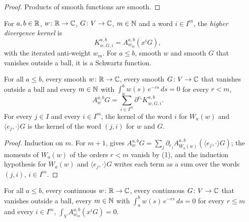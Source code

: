 \begin{proof}
\leanok
Products of smooth functions are smooth.
\end{proof}

\begin{definition}
\label{def:higher-divergence-kernel}
\leanok
{}
For $a, b \in \mathbb{R}$, $w \colon \mathbb{R} \to \mathbb{C}$, $G \colon V \to \mathbb{C}$, $m \in \mathbb{N}$ and a word $i \in I^m$,
the \emph{higher divergence kernel} is
\[
  K^{a,b}_{w,G,i} = A^{a,b}_{w_m} (x^i G) ,
\]
with the iterated anti-weight $w_m$. For $a \leq b$, smooth $w$ and smooth $G$ that vanishes
outside a ball, it is a Schwartz function.
\end{definition}

\begin{theorem}
\label{thm:weighted-dilation-higher}
\leanok
{}
For all $a \leq b$, every smooth $w \colon \mathbb{R} \to \mathbb{C}$, every smooth $G \colon V \to \mathbb{C}$ that
vanishes outside a ball and every $m \in \mathbb{N}$ with $\int_a^b w(s) \, e^{-rs} \, ds = 0$ for every
$r < m$,
\[
  A^{a,b}_w G = \sum_{i \in I^m} \partial^{e_i} K^{a,b}_{w,G,i} .
\]
For every $j \in I$ and every $i \in I^m$, the kernel of the word $i$ for $W_a(w)$ and
$\langle e_j, \cdot \rangle G$ is the kernel of the word $(j, i)$ for $w$ and $G$.
\end{theorem}

\begin{proof}
\leanok
Induction on $m$. For $m + 1$,  gives
$A^{a,b}_w G = \sum_j \partial_{e_j} A^{a,b}_{W_a(w)} (\langle e_j, \cdot \rangle G)$; the
moments of $W_a(w)$ of the orders $r < m$ vanish by  (1), and the
induction hypothesis for $W_a(w)$ and $\langle e_j, \cdot \rangle G$ writes each term as a sum
over the words $(j, i)$, $i \in I^m$.
\end{proof}

\begin{lemma}
\label{lem:higher-divergence-mean-zero}
\leanok
{}
For all $a \leq b$, every continuous $w \colon \mathbb{R} \to \mathbb{C}$, every continuous $G \colon V \to \mathbb{C}$
that vanishes outside a ball, every $m \in \mathbb{N}$ with $\int_a^b w(s) \, e^{-rs} \, ds = 0$ for
every $r \leq m$ and every $i \in I^m$, $\int_V A^{a,b}_{w_m}(x^i G) = 0$.
\end{lemma}

